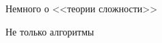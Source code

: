 \begin{frame}{Немного о <<теории сложности>>}
    
\end{frame}

\begin{frame}{Не только алгоритмы}
    
\end{frame}